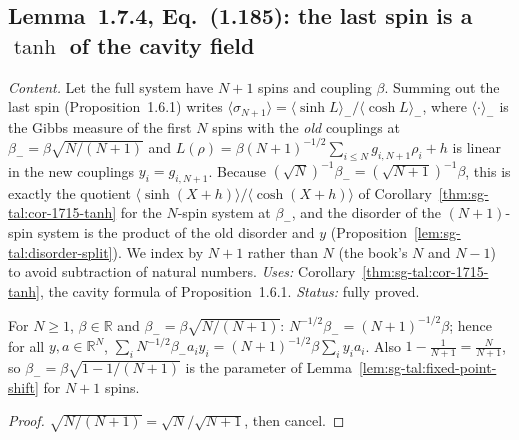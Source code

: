 \subsection{Lemma~1.7.4, Eq.~(1.185): the last spin is a \texorpdfstring{$\tanh$}{tanh} of the cavity field}
\label{sec:sg-tal:fluct-last-spin}

\emph{Content.}  Let the full system have $N+1$ spins and coupling $\beta$.  Summing out the last spin (Proposition~1.6.1) writes $\langle\sigma_{N+1}\rangle=\langle\sinh L\rangle_-/\langle\cosh L\rangle_-$, where $\langle\cdot\rangle_-$ is the Gibbs measure of the first $N$ spins with the \emph{old} couplings at $\beta_-=\beta\sqrt{N/(N+1)}$ and $L(\rho)=\beta(N+1)^{-1/2}\sum_{i\le N}g_{i,N+1}\rho_i+h$ is linear in the new couplings $y_i=g_{i,N+1}$.
Because $(\sqrt N)^{-1}\beta_-=(\sqrt{N+1})^{-1}\beta$, this is exactly the quotient $\langle\sinh(X+h)\rangle/\langle\cosh(X+h)\rangle$ of Corollary~\ref{thm:sg-tal:cor-1715-tanh} for the $N$-spin system at $\beta_-$, and the disorder of the $(N+1)$-spin system is the product of the old disorder and $y$ (Proposition~\ref{lem:sg-tal:disorder-split}).
We index by $N+1$ rather than $N$ (the book's $N$ and $N-1$) to avoid subtraction of natural numbers.
\emph{Uses:} Corollary~\ref{thm:sg-tal:cor-1715-tanh}, the cavity formula of Proposition~1.6.1.  \emph{Status:} fully proved.

\begin{lemma}
\label{lem:sg-tal:beta-minus}
  \leanok
{}
For $N\ge1$, $\beta\in\mathbb R$ and $\beta_-=\beta\sqrt{N/(N+1)}$: $N^{-1/2}\beta_-=(N+1)^{-1/2}\beta$; hence for all $y,a\in\mathbb R^N$, $\sum_iN^{-1/2}\beta_-a_iy_i=(N+1)^{-1/2}\beta\sum_iy_ia_i$.  Also $1-\frac1{N+1}=\frac N{N+1}$, so $\beta_-=\beta\sqrt{1-1/(N+1)}$ is the parameter of Lemma~\ref{lem:sg-tal:fixed-point-shift} for $N+1$ spins.
\end{lemma}
\begin{proof}
  \leanok
$\sqrt{N/(N+1)}=\sqrt N/\sqrt{N+1}$, then cancel.
\end{proof}

